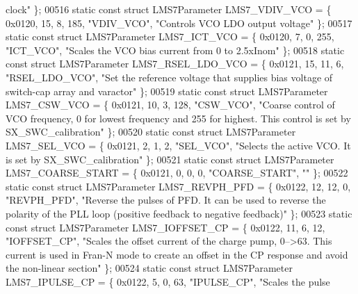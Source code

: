\begin{DoxyCode}
{       clock"} \};
00516 \textcolor{keyword}{static} \textcolor{keyword}{const} \textcolor{keyword}{struct }LMS7Parameter LMS7_VDIV_VCO = \{ 0x0120, 15, 8, 185, \textcolor{stringliteral}{"VDIV\_VCO"}, \textcolor{stringliteral}{"Controls VCO LDO
       output voltage"} \};
00517 \textcolor{keyword}{static} \textcolor{keyword}{const} \textcolor{keyword}{struct }LMS7Parameter LMS7_ICT_VCO = \{ 0x0120, 7, 0, 255, \textcolor{stringliteral}{"ICT\_VCO"}, \textcolor{stringliteral}{"Scales the VCO bias
       current from 0 to 2.5xInom"} \};
00518 \textcolor{keyword}{static} \textcolor{keyword}{const} \textcolor{keyword}{struct }LMS7Parameter LMS7_RSEL_LDO_VCO = \{ 0x0121, 15, 11, 6, \textcolor{stringliteral}{"RSEL\_LDO\_VCO"}, \textcolor{stringliteral}{"Set the
       reference voltage that supplies bias voltage of switch-cap array and varactor"} \};
00519 \textcolor{keyword}{static} \textcolor{keyword}{const} \textcolor{keyword}{struct }LMS7Parameter LMS7_CSW_VCO = \{ 0x0121, 10, 3, 128, \textcolor{stringliteral}{"CSW\_VCO"}, \textcolor{stringliteral}{"Coarse control of VCO
       frequency, 0 for lowest frequency and 255 for highest. This control is set by SX\_SWC\_calibration"} \};
00520 \textcolor{keyword}{static} \textcolor{keyword}{const} \textcolor{keyword}{struct }LMS7Parameter LMS7_SEL_VCO = \{ 0x0121, 2, 1, 2, \textcolor{stringliteral}{"SEL\_VCO"}, \textcolor{stringliteral}{"Selects the active VCO. It
       is set by SX\_SWC\_calibration"} \};
00521 \textcolor{keyword}{static} \textcolor{keyword}{const} \textcolor{keyword}{struct }LMS7Parameter LMS7_COARSE_START = \{ 0x0121, 0, 0, 0, \textcolor{stringliteral}{"COARSE\_START"}, \textcolor{stringliteral}{""} \};
00522 \textcolor{keyword}{static} \textcolor{keyword}{const} \textcolor{keyword}{struct }LMS7Parameter LMS7_REVPH_PFD = \{ 0x0122, 12, 12, 0, \textcolor{stringliteral}{"REVPH\_PFD"}, \textcolor{stringliteral}{"Reverse the pulses of
       PFD. It can be used to reverse the polarity of the PLL loop (positive feedback to negative feedback)"} \};
00523 \textcolor{keyword}{static} \textcolor{keyword}{const} \textcolor{keyword}{struct }LMS7Parameter LMS7_IOFFSET_CP = \{ 0x0122, 11, 6, 12, \textcolor{stringliteral}{"IOFFSET\_CP"}, \textcolor{stringliteral}{"Scales the offset
       current of the charge pump, 0-->63. This current is used in Fran-N mode to create an offset in the CP
       response and avoid the non-linear section"} \};
00524 \textcolor{keyword}{static} \textcolor{keyword}{const} \textcolor{keyword}{struct }LMS7Parameter LMS7_IPULSE_CP = \{ 0x0122, 5, 0, 63, \textcolor{stringliteral}{"IPULSE\_CP"}, \textcolor{stringliteral}{"Scales the pulse
}
\end{DoxyCode}
